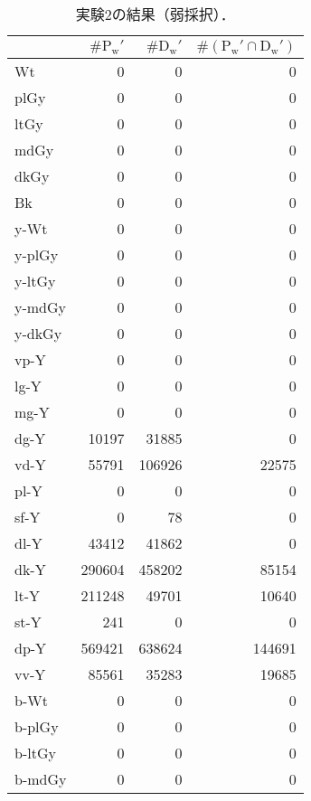 \documentclass[uplatex,paper=a4,fontsize=4.0truemm,jafontsize=4.0truemm,head_space=30.0truemm,foot_space=30.0truemm,baselineskip=8.0truemm,line_length=40zw,gutter=25.0truemm,oneside,openany,fleqn,hanging_panctuation,open_bracket_pos=nibu_tentsuki,dvipdfmx,jis2004,book,titlepage]{jlreq}
\theoremstyle{mystyle}
\newcommand{\captiondot}[1]{\caption{#1．}}
\newcommand{\tableinput}[4]{\begin{table}[btp]\centering\captiondot{#3}\label{tab:#4}\begin{tabular}{#1}#2\end{tabular}\end{table}}
\newcommand{\parentheses}[1]{\left(#1\right)}
\begin{document}
				\tableinput{l|rrr}{ & \(\#\textrm{P}_\textrm{w}'\) & \(\#\textrm{D}_\textrm{w}'\) & \(\#\parentheses{\textrm{P}_\textrm{w}'\cap\textrm{D}_\textrm{w}'}\) \\ \hline
					Wt & 0 & 0 & 0 \\
					plGy & 0 & 0 & 0 \\
					ltGy & 0 & 0 & 0 \\
					mdGy & 0 & 0 & 0 \\
					dkGy & 0 & 0 & 0 \\
					Bk & 0 & 0 & 0 \\
					y-Wt & 0 & 0 & 0 \\
					y-plGy & 0 & 0 & 0 \\
					y-ltGy & 0 & 0 & 0 \\
					y-mdGy & 0 & 0 & 0 \\
					y-dkGy & 0 & 0 & 0 \\
					vp-Y & 0 & 0 & 0 \\
					lg-Y & 0 & 0 & 0 \\
					mg-Y & 0 & 0 & 0 \\
					dg-Y & 10197 & 31885 & 0 \\
					vd-Y & 55791 & 106926 & 22575 \\
					pl-Y & 0 & 0 & 0 \\
					sf-Y & 0 & 78 & 0 \\
					dl-Y & 43412 & 41862 & 0 \\
					dk-Y & 290604 & 458202 & 85154 \\
					lt-Y & 211248 & 49701 & 10640 \\
					st-Y & 241 & 0 & 0 \\
					dp-Y & 569421 & 638624 & 144691 \\
					vv-Y & 85561 & 35283 & 19685 \\
					b-Wt & 0 & 0 & 0 \\
					b-plGy & 0 & 0 & 0 \\
					b-ltGy & 0 & 0 & 0 \\
					b-mdGy & 0 & 0 & 0}{実験2の結果（弱採択）}{result23}
\end{document}
